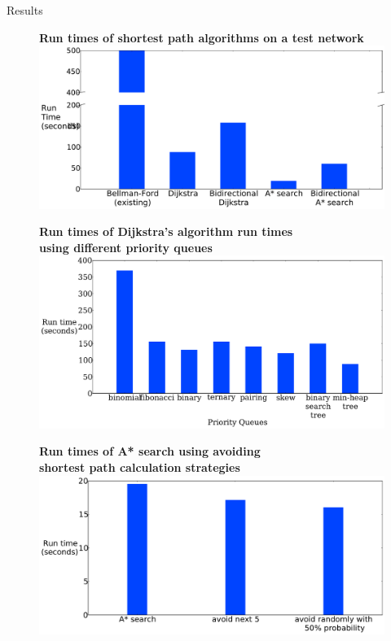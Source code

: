 \documentclass[final]{beamer}
\begin{document}
\begin{frame}{ }
\begin{columns}[t]
\begin{column}{.28\linewidth}
            \begin{block}{Results}
                \begin{figure}
                    \centering
                    {\bfseries \qquad Run times of shortest path algorithms on a test network}
                    \includegraphics[width=\linewidth]{img/runtime}
                \end{figure}
                \begin{figure}
                    \centering
                    {\bfseries \qquad Run times of Dijkstra's algorithm run times\\ \qquad using different priority queues}
                    \includegraphics[width=\linewidth]{img/pq_runtime}
                \end{figure}
                \begin{figure}
                    \centering
                    {\bfseries \qquad Run times of A* search using avoiding\\ \qquad shortest path calculation strategies}
                    \includegraphics[width=\linewidth]{img/random_runtime}
                \end{figure}
            \end{block}


\end{column}
\end{columns}
\end{frame}
\end{document}
